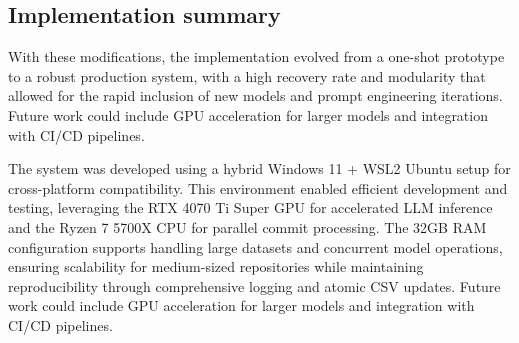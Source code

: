 \subsection{Implementation summary}
With these modifications, the implementation evolved from a one-shot prototype to a robust production system, with a high recovery rate and modularity that allowed for the rapid inclusion of new models and prompt engineering iterations. Future work could include GPU acceleration for larger models and integration with CI/CD pipelines.

The system was developed using a hybrid Windows 11 + WSL2 Ubuntu setup for cross-platform compatibility. This environment enabled efficient development and testing, leveraging the RTX 4070 Ti Super GPU for accelerated LLM inference and the Ryzen 7 5700X CPU for parallel commit processing. The 32GB RAM configuration supports handling large datasets and concurrent model operations, ensuring scalability for medium-sized repositories while maintaining reproducibility through comprehensive logging and atomic CSV updates. Future work could include GPU acceleration for larger models and integration with CI/CD pipelines.
